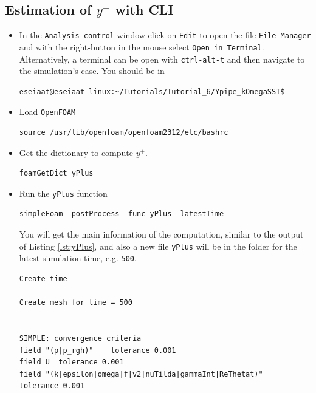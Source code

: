 \documentclass[
parskip=half,      %
DIV=12,            %
headings=normal,   %
fontsize=11pt,     %
english            %
]{scrartcl}
\begin{document}
	\subsection{Estimation of $y^+$ with CLI}
	\begin{itemize}
		\item In the \texttt{Analysis control} window click on \texttt{Edit} to open the file \texttt{File Manager} and with the right-button in the mouse select \texttt{Open in Terminal}. Alternatively, a terminal can be open with \texttt{ctrl-alt-t} and then navigate to the simulation's case. You should be in 
		
		\begin{lstlisting}[style=output ]
eseiaat@eseiaat-linux:~/Tutorials/Tutorial_6/Ypipe_kOmegaSST$
		\end{lstlisting}
	
	
		\item Load \texttt{OpenFOAM}
		
		\begin{lstlisting}[style=terminal]
source /usr/lib/openfoam/openfoam2312/etc/bashrc
		\end{lstlisting}
		
		
		\item Get the dictionary to compute $y^+$.
		\begin{lstlisting}[style=terminal]
foamGetDict yPlus
		\end{lstlisting}
		
		\item Run the \texttt{yPlus} function
		\begin{lstlisting}[style=terminal]
simpleFoam -postProcess -func yPlus -latestTime
		\end{lstlisting}
		
		You will get the main information of the computation, similar to the output of Listing \ref{lst:yPlus}, and also a new file \texttt{yPlus}
		will be in the folder for the latest simulation time, e.g. \texttt{500}. 
		
		\begin{lstlisting}[style=output,caption={Output of \texttt{yPlus}} function, label={lst:yPlus}]
Create time

Create mesh for time = 500


SIMPLE: convergence criteria
field "(p|p_rgh)"	 tolerance 0.001
field U	 tolerance 0.001
field "(k|epsilon|omega|f|v2|nuTilda|gammaInt|ReThetat)"	 tolerance 0.001


\end{lstlisting}
\end{itemize}
\end{document}
